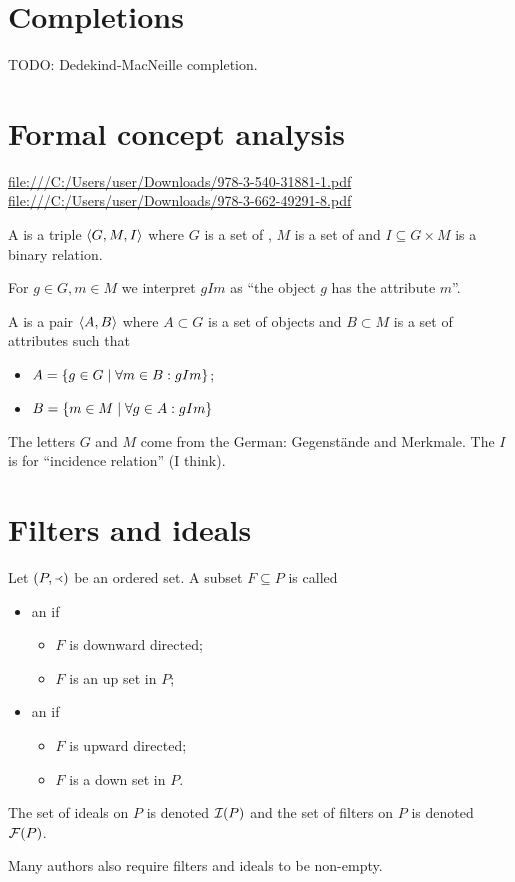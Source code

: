 \section{Completions}
TODO: Dedekind-MacNeille completion.

\section{Formal concept analysis}
\url{file:///C:/Users/user/Downloads/978-3-540-31881-1.pdf}
\url{file:///C:/Users/user/Downloads/978-3-662-49291-8.pdf}

\begin{definition}
A  is a triple $\left\langle G,M,I \right\rangle$ where $G$ is a set of , $M$ is a set of  and $I\subseteq G\times M$ is a binary relation.

For $g\in G, m\in M$ we interpret $gIm$ as ``the object $g$ has the attribute $m$''.



A  is a pair $\left\langle A,B \right\rangle$ where $A\subset G$ is a set of objects and $B\subset M$ is a set of attributes such that
\begin{itemize}
\item $A = \left\{ g\in G \;\middle|\; \forall m\in B: gIm \right\}$;
\item $B = \left\{ m\in M \;\middle|\; \forall g\in A: gIm \right\}$
\end{itemize}
\end{definition}
The letters $G$ and $M$ come from the German: Gegenstände and Merkmale. The $I$ is for ``incidence relation'' (I think).

\section{Filters and ideals}
\begin{definition}
Let $\left( P,\Yleft \right)$ be an ordered set. A subset $F\subseteq P$ is called
\begin{itemize}
\item an  if
\begin{itemize}
\item $F$ is downward directed;
\item $F$ is an up set in $P$;
\end{itemize}
\item an  if
\begin{itemize}
\item $F$ is upward directed;
\item $F$ is a down set in $P$.
\end{itemize}
\end{itemize}
The set of ideals on $P$ is denoted $\operatorname{\mathcal{I}}(P)$ and the set of filters on $P$ is denoted $\operatorname{\mathcal{F}}(P)$.
\end{definition}
Many authors also require filters and ideals to be non-empty.

